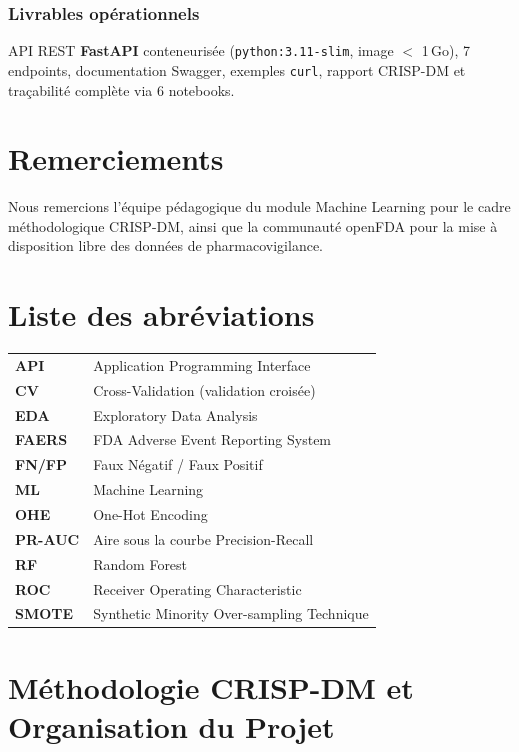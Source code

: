 \documentclass[11pt,a4paper,twoside,openright]{report}
\begin{document}
\subsection*{Livrables opérationnels}
API REST \textbf{FastAPI} conteneurisée (\texttt{python:3.11-slim}, image $<$ 1\,Go), 7 endpoints, documentation Swagger, exemples \texttt{curl}, rapport CRISP-DM et traçabilité complète via 6 notebooks.

\chapter*{Remerciements}
Nous remercions l'équipe pédagogique du module Machine Learning pour le cadre méthodologique CRISP-DM, ainsi que la communauté openFDA pour la mise à disposition libre des données de pharmacovigilance.

\chapter*{Liste des abréviations}
\begin{tabular}{@{}ll@{}}
  \textbf{API}     & Application Programming Interface \\
  \textbf{CV}      & Cross-Validation (validation croisée) \\
  \textbf{EDA}     & Exploratory Data Analysis \\
  \textbf{FAERS}   & FDA Adverse Event Reporting System \\
  \textbf{FN/FP}   & Faux Négatif / Faux Positif \\
  \textbf{ML}      & Machine Learning \\
  \textbf{OHE}     & One-Hot Encoding \\
  \textbf{PR-AUC}  & Aire sous la courbe Precision-Recall \\
  \textbf{RF}      & Random Forest \\
  \textbf{ROC}     & Receiver Operating Characteristic \\
  \textbf{SMOTE}   & Synthetic Minority Over-sampling Technique \\
\end{tabular}

\tableofcontents
\listoffigures
\listoftables
\clearpage
{}

\chapter*{Méthodologie CRISP-DM et Organisation du Projet}
\end{document}
